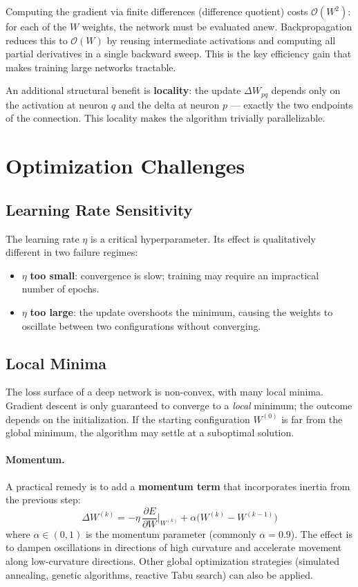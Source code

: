 \documentclass[11pt,a4paper]{article}
\theoremstyle{definition}
\theoremstyle{plain}
\theoremstyle{remark}
\begin{document}
Computing the gradient via finite differences (difference quotient) costs $\mathcal{O}(W^2)$: for each of the $W$ weights, the network must be evaluated anew. Backpropagation reduces this to $\mathcal{O}(W)$ by reusing intermediate activations and computing all partial derivatives in a single backward sweep. This is the key efficiency gain that makes training large networks tractable.

An additional structural benefit is \textbf{locality}: the update $\Delta W_{pq}$ depends only on the activation at neuron $q$ and the delta at neuron $p$ --- exactly the two endpoints of the connection. This locality makes the algorithm trivially parallelizable.


\section{Optimization Challenges}

\subsection{Learning Rate Sensitivity}

The learning rate $\eta$ is a critical hyperparameter. Its effect is qualitatively different in two failure regimes:

\begin{itemize}
    \item $\eta$ \textbf{too small}: convergence is slow; training may require an impractical number of epochs.
    \item $\eta$ \textbf{too large}: the update overshoots the minimum, causing the weights to oscillate between two configurations without converging.
\end{itemize}

\subsection{Local Minima}

The loss surface of a deep network is non-convex, with many local minima. Gradient descent is only guaranteed to converge to a \emph{local} minimum; the outcome depends on the initialization. If the starting configuration $W^{(0)}$ is far from the global minimum, the algorithm may settle at a suboptimal solution.

\paragraph{Momentum.} A practical remedy is to add a \textbf{momentum term} that incorporates inertia from the previous step:
\[
    \Delta W^{(k)} = -\eta\,\frac{\partial E}{\partial W}\bigg|_{W^{(k)}} + \alpha\bigl(W^{(k)} - W^{(k-1)}\bigr)
\]
where $\alpha \in (0,1)$ is the momentum parameter (commonly $\alpha = 0.9$). The effect is to dampen oscillations in directions of high curvature and accelerate movement along low-curvature directions. Other global optimization strategies (simulated annealing, genetic algorithms, reactive Tabu search) can also be applied.
\end{document}
